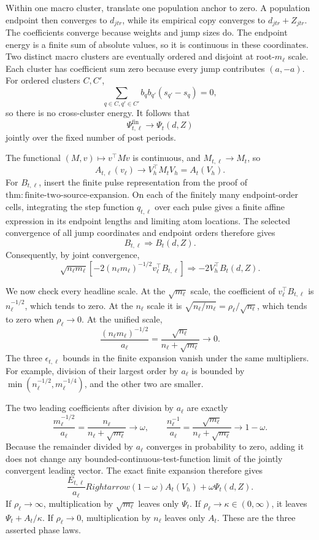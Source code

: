 Within one macro cluster, translate one population anchor to zero.  A population endpoint then converges to \(d_{jtr}\), while its empirical copy converges to \(d_{jtr}+Z_{jtr}\).  The coefficients converge because weights and jump sizes do.  The endpoint energy is a finite sum of absolute values, so it is continuous in these coordinates.  Two distinct macro clusters are eventually ordered and disjoint at root-\(m_\ell\) scale.  Each cluster has coefficient sum zero because every jump contributes \((a,-a)\).  For ordered clusters \(C,C'\),
\[
 \sum_{q\in C,q'\in C'}b_qb_{q'}(s_{q'}-s_q)=0,
\]
so there is no cross-cluster energy.  It follows that
\[
 \Psi^{\mathrm{fin}}_{t,\ell}\longrightarrow\Psi_t(d,Z)
\]
jointly over the fixed number of post periods.

The functional \((M,v)\mapsto v^\top Mv\) is continuous, and
\(M_{t,\ell}\to M_t\), so
\[
 A_{t,\ell}(v_\ell)\longrightarrow V_h^\top M_tV_h=A_t(V_h).
\]
For \(B_{t,\ell}\), insert the finite pulse representation from the proof of
\(\mathrm{thm:finite\mbox{-}two\mbox{-}source\mbox{-}expansion}\).  On each of the finitely many endpoint-order cells, integrating the step function \(q_{t,\ell}\) over each pulse gives a finite affine expression in its endpoint lengths and limiting atom locations.  The selected convergence of all jump coordinates and endpoint orders therefore gives
\[
 B_{t,\ell}\Rightarrow B_t(d,Z).
\]
Consequently, by joint convergence,
\[
 \sqrt{n_\ell m_\ell}\left[-2(n_\ell m_\ell)^{-1/2}
 v_\ell^\top B_{t,\ell}\right]
 \Rightarrow-2V_h^\top B_t(d,Z).
\]

We now check every headline scale.  At the \(\sqrt{m_\ell}\) scale, the coefficient of \(v_\ell^\top B_{t,\ell}\) is \(n_\ell^{-1/2}\), which tends to zero.  At the \(n_\ell\) scale it is
\(\sqrt{n_\ell/m_\ell}=\rho_\ell/\sqrt{n_\ell}\), which tends to zero when \(\rho_\ell\to0\).  At the unified scale,
\[
 \frac{(n_\ell m_\ell)^{-1/2}}{a_\ell}
 =\frac{\sqrt{n_\ell}}{n_\ell+\sqrt{m_\ell}}\longrightarrow0.
\]
The three \(\epsilon_{t,\ell}\) bounds in the finite expansion vanish under the same multipliers.  For example, division of their largest order by \(a_\ell\) is bounded by
\(\min(n_\ell^{-1/2},m_\ell^{-1/4})\), and the other two are smaller.

The two leading coefficients after division by \(a_\ell\) are exactly
\[
 \frac{m_\ell^{-1/2}}{a_\ell}
 =\frac{n_\ell}{n_\ell+\sqrt{m_\ell}}\longrightarrow\omega,
 \qquad
 \frac{n_\ell^{-1}}{a_\ell}
 =\frac{\sqrt{m_\ell}}{n_\ell+\sqrt{m_\ell}}\longrightarrow1-\omega.
\]
Because the remainder divided by \(a_\ell\) converges in probability to zero, adding it does not change any bounded-continuous-test-function limit of the jointly convergent leading vector.  The exact finite expansion therefore gives
\[
 \frac{E_{t,\ell}}{a_\ell}Rightarrow
 (1-\omega)A_t(V_h)+\omega\Psi_t(d,Z).
\]
If \(\rho_\ell\to\infty\), multiplication by \(\sqrt{m_\ell}\) leaves only \(\Psi_t\).  If \(\rho_\ell\to\kappa\in(0,\infty)\), it leaves
\(\Psi_t+A_t/\kappa\).  If \(\rho_\ell\to0\), multiplication by \(n_\ell\) leaves only \(A_t\).  These are the three asserted phase laws.

